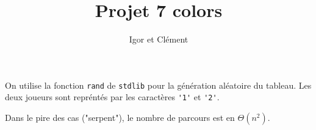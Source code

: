 \documentclass[12pt,L,fira-sans]{paper}
\title{Projet 7 colors}
\author{Igor \maj{Martayan} et Clément \maj{Morand}}
\begin{document}
\maketitle

\begin{qu}
	On utilise la fonction \verb|rand| de \verb|stdlib| pour la génération aléatoire du tableau.
	Les deux joueurs sont repréntés par les caractères \verb|'1'| et \verb|'2'|.
\end{qu}

\begin{qu}
	Dans le pire des cas ("serpent"), le nombre de parcours est en \(\Theta(n^2)\).
\end{qu}
\end{document}
